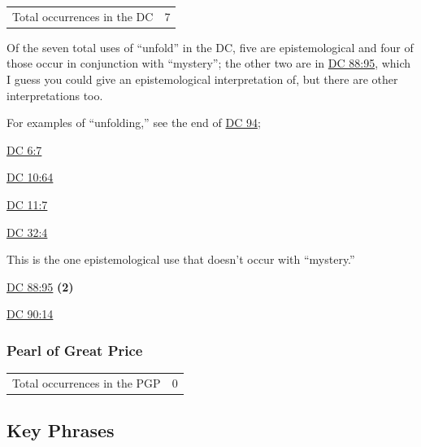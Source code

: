 		\begin{tabular}{ll}
			Total occurrences in the DC & 7
		\end{tabular}
		
		Of the seven total uses of ``unfold'' in the DC, five are epistemological and four of those occur in conjunction with ``mystery''; the other two are in \hyperref[DC88-95]{DC 88:95}, which I guess you could give an epistemological interpretation of, but there are other interpretations too.
		
		For examples of ``unfolding,'' see the end of \hyperref[DC94]{DC 94}; 
		
		\begin{compactdesc}
			\item[{\hyperref[DC6-7]{DC 6:7}}] 
			\item[{\hyperref[DC10-64]{DC 10:64}}] 
			\item[{\hyperref[DC11-7]{DC 11:7}}]
			\item[{\hyperref[DC32-4]{DC 32:4}}] \phantom{.}
				\begin{compactitem}
					\item This is the one epistemological use that doesn't occur with ``mystery.''
				\end{compactitem}
			\item[{\hyperref[DC88-95]{DC 88:95}}] \textbf{(2)}
			\item[{\hyperref[DC90-14]{DC 90:14}}]
		\end{compactdesc}
		
	\subsubsection{Pearl of Great Price} %
		\label{UNFOLD-PGP}
	
		\begin{tabular}{ll}
			Total occurrences in the PGP & 0
		\end{tabular}
		
		
\subsection{Key Phrases} %
	\label{UNFOLD-PHRASES}

